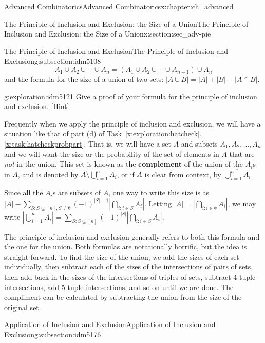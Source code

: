 \documentclass[oneside,10pt,]{book}
\newcommand{\terminology}[1]{\textbf{#1}}
\numberwithin{equation}{chapter}
\newcommand{\card}[1]{\left| #1 \right|}
\begin{document}
\begin{chapterptx}{Advanced Combinatorics}{}{Advanced Combinatorics}{}{}{x:chapter:ch_advanced}
\begin{sectionptx}{The Principle of Inclusion and Exclusion: the Size of a Union}{}{The Principle of Inclusion and Exclusion: the Size of a Union}{}{}{x:section:sec_adv-pie}
\begin{subsectionptx}{The Principle of Inclusion and Exclusion}{}{The Principle of Inclusion and Exclusion}{}{}{g:subsection:idm5108}
\begin{equation*}
A_1 \cup A_2 \cup \cdots \cup A_n = \left(A_1 \cup A_2 \cup \cdots \cup A_{n-1}\right) \cup A_n
\end{equation*}
and the formula for the size of a union of two sets: \(\card{A \cup B} = \card{A} + \card{B} - \card{A\cap B}\).%
\begin{exploration}{}{g:exploration:idm5121}%
Give a proof of your formula for the principle of inclusion and exclusion.%
\space\hspace*{0pt}\hfill{\tiny\hyperlink{g:hint:idm5124-back}{[Hint]}}\end{exploration}
Frequently when we apply the principle of inclusion and exclusion, we will have a situation like that of part (d) of \hyperref[x:task:hatcheckprobpart]{Task~\ref{x:exploration:hatcheck}.\ref{x:task:hatcheckprobpart}}.  That is, we will have a set \(A\) and subsets \(A_1, A_2, \ldots, A_n\) and we will want the size or the probability of the set of elements in \(A\) that are \emph{not} in the union.  This set is known as the \terminology{complement}  of the union of the \(A_i\)s in \(A\), and is denoted by \(A \setminus \bigcup_{i=1}^n A_i\), or if \(A\) is clear from context, by \(\overline{\bigcup_{i=1}^n A_i}\).%
\par
Since all the \(A_i\)s are subsets of \(A\), one way to write this size is as \(|A| - \sum_{S:S \subseteq [n], S \ne \emptyset}(-1)^{|S|-1} |\bigcap_{i:i \in S}A_i|\).  Letting \(|A| = \left|\bigcap_{i:i \in \emptyset} A_i\right|\), we may write \(\left|\overline{\bigcup_{i=1}^n A_i}\right| = \sum_{S:S \subseteq [n]} (-1)^{|S|}\left| \bigcap_{i:i\in S} A_i\right|\).%
\par
The principle of inclusion and exclusion generally refers to both this formula and the one for the union.  Both formulas are notationally horrific, but the idea is straight forward.  To find the size of the union, we add the sizes of each set individually, then subtract each of the sizes of the intersections of pairs of sets, then add back in the sizes of the intersections of triples of sets, subtract 4-tuple intersections, add 5-tuple intersections, and so on until we are done.  The compliment can be calculated by subtracting the union from the size of the original set.%
\end{subsectionptx}
%
%
\typeout{************************************************}
\typeout{************************************************}
%
\begin{subsectionptx}{Application of Inclusion and Exclusion}{}{Application of Inclusion and Exclusion}{}{}{g:subsection:idm5176}

\end{subsectionptx}
\end{sectionptx}
\end{chapterptx}
\end{document}

